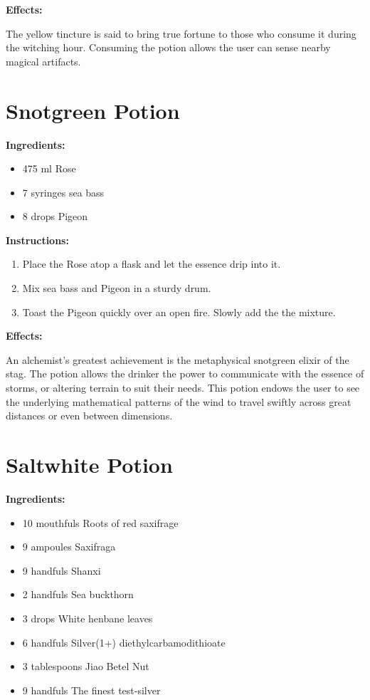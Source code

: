 \documentclass{article}
\begin{document}
\textbf{Effects:}

The yellow tincture is said to bring true fortune to those who consume it during the witching hour. Consuming the potion allows the user can sense nearby magical artifacts.

\newpage
\section*{Snotgreen Potion}

\textbf{Ingredients:}

\begin{itemize}
  \item 475 ml Rose
  \item 7 syringes sea ​​bass
  \item 8 drops Pigeon
\end{itemize}

\textbf{Instructions:}

\begin{enumerate}
  \item Place the Rose atop a flask and let the essence drip into it.
  \item Mix sea ​​bass and Pigeon in a sturdy drum.
  \item Toast the Pigeon quickly over an open fire. Slowly add the the mixture.
\end{enumerate}

\textbf{Effects:}

An alchemist's greatest achievement is the metaphysical snotgreen elixir of the stag. The potion allows the drinker the power to communicate with the essence of storms, or altering terrain to suit their needs. This potion endows the user to see the underlying mathematical patterns of the wind to travel swiftly across great distances or even between dimensions.

\newpage
\section*{Saltwhite Potion}

\textbf{Ingredients:}

\begin{itemize}
  \item 10 mouthfuls Roots of red saxifrage
  \item 9 ampoules Saxifraga
  \item 9 handfuls Shanxi
  \item 2 handfuls Sea buckthorn
  \item 3 drops White henbane leaves
  \item 6 handfuls Silver(1+) diethylcarbamodithioate
  \item 3 tablespoons Jiao Betel Nut
  \item 9 handfuls The finest test-silver
\end{itemize}
\end{document}
